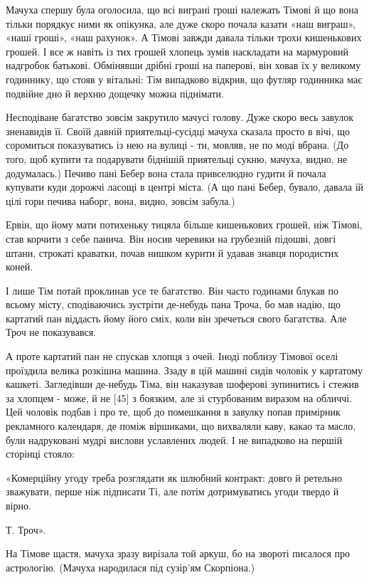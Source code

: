 Мачуха спершу була оголосила, що всі виграні гроші належать Тімові й що вона тільки порядкує ними як опікунка, але дуже скоро почала казати «наш виграш», «наші гроші», «наш рахунок». А Тімові завжди давала тільки трохи кишенькових грошей. І все ж навіть із тих грошей хлопець зумів наскладати на мармуровий надгробок батькові. Обмінявши дрібні гроші на паперові, він ховав їх у великому годиннику, що стояв у вітальні: Тім випадково відкрив, що футляр годинника має подвійне дно й верхню дощечку можна піднімати.

Несподіване багатство зовсім закрутило мачусі голову. Дуже скоро весь завулок зненавидів її. Своїй давній приятельці-сусідці мачуха сказала просто в вічі, що соромиться показуватись із нею на вулиці - ти, мовляв, не по моді вбрана. (До того, щоб купити та подарувати біднішій приятельці сукню, мачуха, видно, не додумалась.) Печиво пані Бебер вона стала привселюдно гудити й почала купувати куди дорожчі ласощі в центрі міста. (А що пані Бебер, бувало, давала їй цілі гори печива наборг, вона, видно, зовсім забула.)

Ервін, що йому мати потихеньку тицяла більше кишенькових грошей, ніж Тімові, став корчити з себе панича. Він носив черевики на грубезній підошві, довгі штани, строкаті краватки, почав нишком курити й удавав знавця породистих коней.

І лише Тім потай проклинав усе те багатство. Він часто годинами блукав по всьому місту, сподіваючись зустріти де-небудь пана Троча, бо мав надію, що картатий пан віддасть йому його сміх, коли він зречеться свого багатства. Але Троч не показувався.

А проте картатий пан не спускав хлопця з очей. Іноді поблизу Тімової оселі проїздила велика розкішна машина. Ззаду в цій машині сидів чоловік у картатому кашкеті. Загледівши де-небудь Тіма, він наказував шоферові зупинитись і стежив за хлопцем - може, й не [45] з боязким, але зі стурбованим виразом на обличчі. Цей чоловік подбав і про те, щоб до помешкання в завулку попав примірник рекламного календаря, де поміж віршиками, що вихваляли каву, какао та масло, були надруковані мудрі вислови уславлених людей. І не випадково на першій сторінці стояло:

«Комерційну угоду треба розглядати як шлюбний контракт: довго й ретельно зважувати, перше ніж підписати Ті, але потім дотримуватись угоди твердо й вірно.

Т. Троч».

На Тімове щастя, мачуха зразу вирізала той аркуш, бо на звороті писалося про астрологію. (Мачуха народилася під сузір'ям Скорпіона.)

